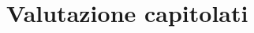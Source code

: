  \pagebreak
\section{Valutazione capitolati}
 \pagebreak
 \pagebreak
 \pagebreak
 \pagebreak
 \pagebreak
 \pagebreak
 \pagebreak